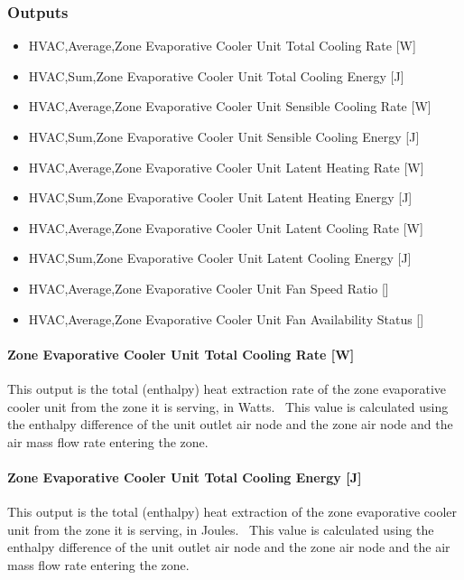 \subsubsection{Outputs}\label{outputs-4-021}

\begin{itemize}
\item
  HVAC,Average,Zone Evaporative Cooler Unit Total Cooling Rate {[}W{]}
\item
  HVAC,Sum,Zone Evaporative Cooler Unit Total Cooling Energy {[}J{]}
\item
  HVAC,Average,Zone Evaporative Cooler Unit Sensible Cooling Rate {[}W{]}
\item
  HVAC,Sum,Zone Evaporative Cooler Unit Sensible Cooling Energy {[}J{]}
\item
  HVAC,Average,Zone Evaporative Cooler Unit Latent Heating Rate {[}W{]}
\item
  HVAC,Sum,Zone Evaporative Cooler Unit Latent Heating Energy {[}J{]}
\item
  HVAC,Average,Zone Evaporative Cooler Unit Latent Cooling Rate {[}W{]}
\item
  HVAC,Sum,Zone Evaporative Cooler Unit Latent Cooling Energy {[}J{]}
\item
  HVAC,Average,Zone Evaporative Cooler Unit Fan Speed Ratio {[]}
\item
  HVAC,Average,Zone Evaporative Cooler Unit Fan Availability Status {[]}
\end{itemize}

\paragraph{Zone Evaporative Cooler Unit Total Cooling Rate {[}W{]}}\label{zone-evaporative-cooler-unit-total-cooling-rate-w}

This output is the total (enthalpy) heat extraction rate of the zone evaporative cooler unit from the zone it is serving, in Watts.~ This value is calculated using the enthalpy difference of the unit outlet air node and the zone air node and the air mass flow rate entering the zone.

\paragraph{Zone Evaporative Cooler Unit Total Cooling Energy {[}J{]}}\label{zone-evaporative-cooler-unit-total-cooling-energy-j}

This output is the total (enthalpy) heat extraction of the zone evaporative cooler unit from the zone it is serving, in Joules.~ This value is calculated using the enthalpy difference of the unit outlet air node and the zone air node and the air mass flow rate entering the zone.

